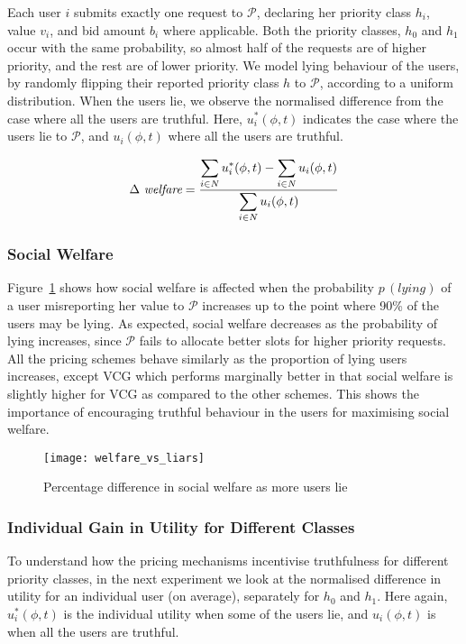 Each user $i$ submits exactly one request to $\mathcal{P}$, declaring her priority class $h_i$, value $v_i$, and bid amount $b_i$ where applicable.
Both the priority classes, $h_0$ and $h_1$ occur with the same probability, so almost half of the requests are of higher priority, and the rest are of lower priority. 
We model lying behaviour of the users, by randomly flipping their reported priority class $h$ to $\mathcal{P}$, according to a uniform distribution.
When the users lie, we observe the normalised difference from the case where all the users are truthful.
Here, $u^*_i(\phi,t)$ indicates the case where the users lie to $\mathcal{P}$,
and $u_i(\phi,t)$ where all the users are truthful.

\begin{equation}
	\Delta \ \textrm{\itshape welfare} = \frac{
						\displaystyle\sum_{i \in N} u^*_i(\phi,t) - 
						\displaystyle\sum_{i \in N} u_i(\phi,t)
					}{
						\displaystyle\sum_{i \in N} u_i(\phi,t)
					}
\end{equation}

\subsubsection{Social Welfare}
Figure~\ref{fig__welfare_vs_liars} shows how social welfare is affected when the probability $p\,(lying)$ of a user misreporting her value to 
$\mathcal{P}$ increases up to the point where 90\% of the users may be lying.
As expected, social welfare decreases as the probability of lying increases, since $\mathcal{P}$ fails to allocate better slots for higher priority requests.
All the pricing schemes behave similarly as the proportion of lying users increases, 
except VCG which performs marginally better in that social welfare is slightly higher for VCG as compared to the other schemes.
This shows the importance of encouraging truthful behaviour in the users for maximising social welfare.

\begin{figure}[tbp]
	\centering
	\texttt{[image: welfare\_vs\_liars]}
	\caption{Percentage difference in social welfare as more users lie}
	\label{fig__welfare_vs_liars}
\end{figure}

\subsubsection{Individual Gain in Utility for Different Classes}
To understand how the pricing mechanisms incentivise truthfulness for different priority classes, 
in the next experiment we look at the normalised difference in utility for an individual user (on average), separately for $h_0$ and $h_1$.
Here again, $u^*_i(\phi,t)$ is the individual utility when some of the users lie,
and $u_i(\phi,t)$ is when all the users are truthful.

